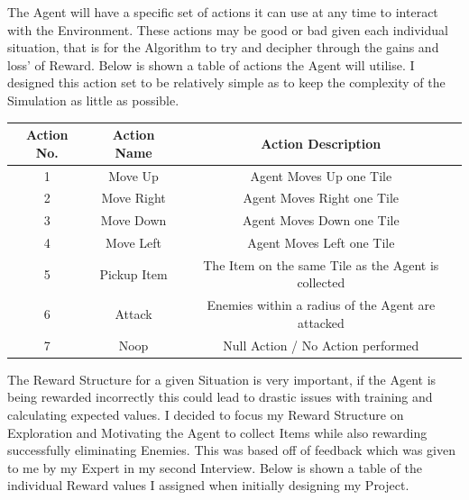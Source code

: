 \begin{flushleft}
            The Agent will have a specific set of actions it can use at any time to interact with the Environment. These actions may be good
            or bad given each individual situation, that is for the Algorithm to try and decipher through the gains and loss' of Reward. Below
            is shown a table of actions the Agent will utilise. I designed this action set to be relatively simple as to keep the complexity of the
            Simulation as little as possible. 

            \vspace{0.2cm}
            \begin{center}
                \begin{tabular}{| c | c | c |}
                    \hline
                    Action No. & Action Name & Action Description \\
                    \hline
                    1 & Move Up & Agent Moves Up one Tile \\
                    \hline
                    2 & Move Right & Agent Moves Right one Tile \\
                    \hline
                    3 & Move Down & Agent Moves Down one Tile \\
                    \hline
                    4 & Move Left & Agent Moves Left one Tile \\
                    \hline
                    5 & Pickup Item & The Item on the same Tile as the Agent is collected \\
                    \hline
                    6 & Attack & Enemies within a radius of the Agent are attacked \\
                    \hline
                    7 & Noop & Null Action / No Action performed \\
                    \hline
                \end{tabular}
            \end{center}
            \vspace{0.2cm}
            
            The Reward Structure for a given Situation is very important, if the Agent is being rewarded incorrectly this could lead to drastic
            issues with training and calculating expected values. I decided to focus my Reward Structure on Exploration and Motivating the Agent
            to collect Items while also rewarding successfully eliminating Enemies. This was based off of feedback which was given to me by my
            Expert in my second Interview. Below is shown a table of the individual Reward values I assigned when initially designing my Project.


\end{flushleft}

